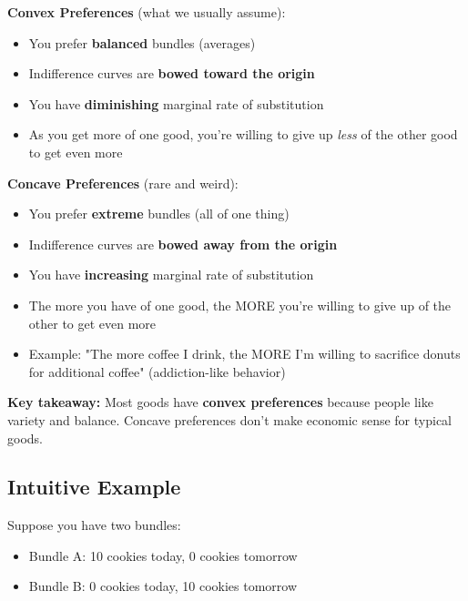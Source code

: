 \documentclass[12pt]{article}
\begin{document}
\begin{tcolorbox}[colback=red!10!white,colframe=red!75!black,title=Don't Get These Confused!]
\textbf{Convex Preferences} (what we usually assume):
\begin{itemize}
\item You prefer \textbf{balanced} bundles (averages)
\item Indifference curves are \textbf{bowed toward the origin}
\item You have \textbf{diminishing} marginal rate of substitution
\item As you get more of one good, you're willing to give up \textit{less} of the other good to get even more
\end{itemize}

\vspace{0.3cm}

\textbf{Concave Preferences} (rare and weird):
\begin{itemize}
\item You prefer \textbf{extreme} bundles (all of one thing)
\item Indifference curves are \textbf{bowed away from the origin}
\item You have \textbf{increasing} marginal rate of substitution
\item The more you have of one good, the MORE you're willing to give up of the other to get even more
\item Example: "The more coffee I drink, the MORE I'm willing to sacrifice donuts for additional coffee" (addiction-like behavior)
\end{itemize}

\vspace{0.3cm}

\textbf{Key takeaway:} Most goods have \textbf{convex preferences} because people like variety and balance. Concave preferences don't make economic sense for typical goods.
\end{tcolorbox}

\subsection*{Intuitive Example}

Suppose you have two bundles:
\begin{itemize}
\item Bundle A: 10 cookies today, 0 cookies tomorrow
\item Bundle B: 0 cookies today, 10 cookies tomorrow
\end{itemize}
\end{document}

